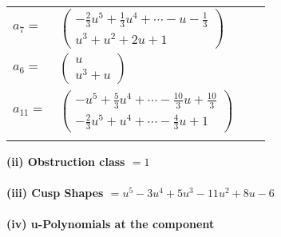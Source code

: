 \documentclass[1p]{elsarticle_modified}
\theoremstyle{definition}
\begin{document}
\begin{tabular}{m{7pt} m{180pt} m{7pt} m{180pt} }
\flushright $a_{7}=$&$\begin{pmatrix}-\frac{2}{3} u^5+\frac{1}{3} u^4+\cdots- u-\frac{1}{3}\\u^3+u^2+2 u+1\end{pmatrix}$ \\
\flushright $a_{6}=$&$\begin{pmatrix}u\\u^3+u\end{pmatrix}$ \\
\flushright $a_{11}=$&$\begin{pmatrix}- u^5+\frac{5}{3} u^4+\cdots-\frac{10}{3} u+\frac{10}{3}\\-\frac{2}{3} u^5+u^4+\cdots-\frac{4}{3} u+1\end{pmatrix}$\\&\end{tabular}
\flushleft \textbf{(ii) Obstruction class $= 1$}\\~\\
\flushleft \textbf{(iii) Cusp Shapes $= u^5-3 u^4+5 u^3-11 u^2+8 u-6$}\\~\\
\newpage\renewcommand{\arraystretch}{1}
\flushleft \textbf{(iv) u-Polynomials at the component}\newline \\
\end{document}

